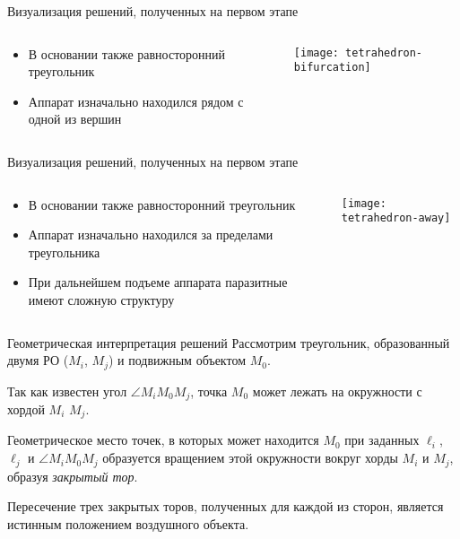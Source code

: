 \documentclass[russian,hyperref={unicode}]{beamer}
\begin{document}
  \begin{frame}{Визуализация решений, полученных на первом этапе}
    \begin{columns}[c]
      \begin{column}{.5\textwidth}
        \begin{itemize}
          \item В основании также равносторонний треугольник
          \item Аппарат изначально находился рядом с одной из вершин
        \end{itemize}
      \end{column}
      \begin{column}{.5\textwidth}
        \begin{center}
          \texttt{[image: tetrahedron-bifurcation]}
        \end{center}
      \end{column}
    \end{columns}
  \end{frame}

  \begin{frame}{Визуализация решений, полученных на первом этапе}
    \begin{columns}[c]
      \begin{column}{.5\textwidth}
        \begin{itemize}
          \item В основании также равносторонний треугольник
          \item Аппарат изначально находился за пределами треугольника
          \item При дальнейшем подъеме аппарата паразитные имеют сложную структуру
        \end{itemize}
      \end{column}
      \begin{column}{.5\textwidth}
        \begin{center}
          \texttt{[image: tetrahedron-away]}
        \end{center}
      \end{column}
    \end{columns}
  \end{frame}

  \begin{frame}{Геометрическая интерпретация решений}
    Рассмотрим треугольник, образованный двумя РО ($M_i$, $M_j$) и подвижным объектом $M_0$.

    Так как известен угол $\angle M_i M_0 M_j$, точка $M_0$ может лежать на окружности с хордой $M_i$ $M_j$.

    Геометрическое место точек, в которых может находится $M_0$ при заданных $\ell_{i}$, $\ell_{j}$ и $\angle M_i M_0 M_j$ образуется вращением этой окружности вокруг хорды $M_i$ и $M_j$, образуя \textit{закрытый тор}.

    Пересечение трех закрытых торов, полученных для каждой из сторон, является истинным положением воздушного объекта.
  \end{frame}
\end{document}
